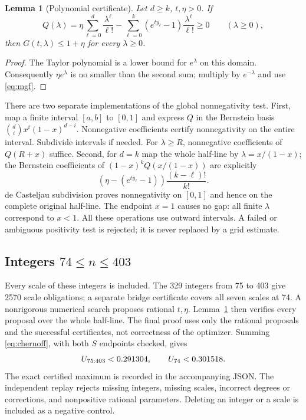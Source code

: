 \documentclass[11pt]{article}
\newtheorem{lemma}{Lemma}
\begin{document}
\begin{lemma}[Polynomial certificate]\label{lem:polynomial}
Let $d\ge k$, $t,\eta>0$. If
\[
 Q(\lambda)=\eta\sum_{\ell=0}^d\frac{\lambda^\ell}{\ell!}
       -\sum_{\ell=0}^k(e^{ty_\ell}-1)\frac{\lambda^\ell}{\ell!}
 \ge0\qquad(\lambda\ge0),
\]
then $G(t,\lambda)\le1+\eta$ for every $\lambda\ge0$.
\end{lemma}
\begin{proof}
The Taylor polynomial is a lower bound for $e^\lambda$ on this domain.
Consequently $\eta e^\lambda$ is no smaller than the second sum;
multiply by $e^{-\lambda}$ and use \eqref{eq:mgf}.
\end{proof}
There are two separate implementations of the global nonnegativity test.
First, map a finite interval $[a,b]$ to $[0,1]$ and express $Q$ in the
Bernstein basis $\binom di x^i(1-x)^{d-i}$. Nonnegative coefficients
certify nonnegativity on the entire interval. Subdivide intervals if
needed. For $\lambda\ge R$, nonnegative coefficients of $Q(R+x)$
suffice. Second, for $d=k$ map the whole half-line by
$\lambda=x/(1-x)$; the Bernstein coefficients of
$(1-x)^k Q(x/(1-x))$ are explicitly
\[
 (\eta-(e^{ty_\ell}-1))\frac{(k-\ell)!}{k!}.
\]
de Casteljau subdivision proves nonnegativity on $[0,1]$ and hence on
the complete original half-line. The endpoint $x=1$ causes no gap:
all finite $\lambda$ correspond to $x<1$.
All these operations use outward intervals. A failed or ambiguous
positivity test is rejected; it is never replaced by a grid estimate.

\subsection{Integers $74\le n\le403$}
Every scale of these integers is included. The 329 integers from 75 to
403 give 2570 scale obligations; a separate bridge certificate covers
all seven scales at 74. A nonrigorous numerical search proposes rational
$t,\eta$. Lemma~\ref{lem:polynomial} then verifies every proposal over
the whole half-line. The final proof uses only the rational proposals
and the successful certificates, not correctness of the optimizer.
Summing \eqref{eq:chernoff}, with both $S$ endpoints checked, gives
\begin{equation}\label{eq:finite}
 U_{75:403}<0.291304,\qquad U_{74}<0.301518.
\end{equation}
The exact certified maximum is recorded in the accompanying JSON.
The independent replay rejects missing integers, missing scales,
incorrect degrees or corrections, and nonpositive rational parameters.
Deleting an integer or a scale is included as a negative control.
\end{document}
